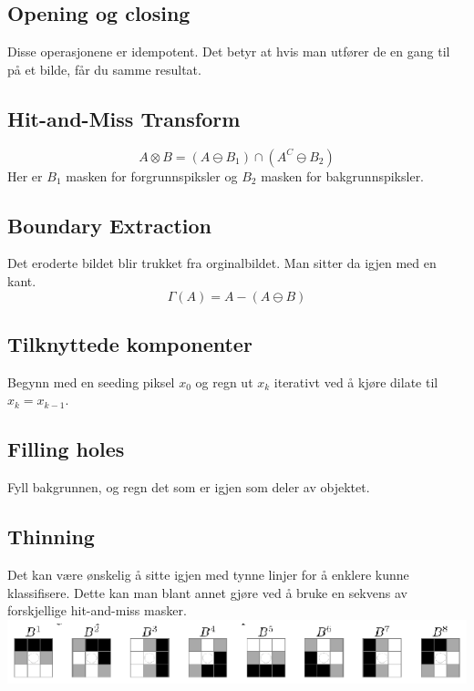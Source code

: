 \subsection{Opening og closing}
Disse operasjonene er idempotent. Det betyr at hvis man utfører de en gang til på et bilde, får du samme resultat.

\subsection{Hit-and-Miss Transform}
\begin{equation}
    A \otimes  B= (A \ominus  B_1) \cap  (A^C \ominus  B_2)
\end{equation}
Her er $B_1$ masken for forgrunnspiksler og $B_2$ masken for bakgrunnspiksler.

\subsection{Boundary Extraction}
Det eroderte bildet blir trukket fra orginalbildet. Man sitter da igjen med en kant.
\begin{equation}
    \Gamma (A) = A - (A \ominus  B)
\end{equation}

\subsection{Tilknyttede komponenter}
Begynn med en seeding piksel $x_0$ og regn ut $x_k$ iterativt ved å kjøre dilate til $x_k= x_{k-1}$.

\subsection{Filling holes}
Fyll bakgrunnen, og regn det som er igjen som deler av objektet.

\subsection{Thinning}
Det kan være ønskelig å sitte igjen med tynne linjer for å enklere kunne klassifisere. Dette kan man blant annet gjøre ved å bruke en sekvens av forskjellige hit-and-miss masker.
\\ \includegraphics[width=\textwidth]{Bilder/hnm.png}

